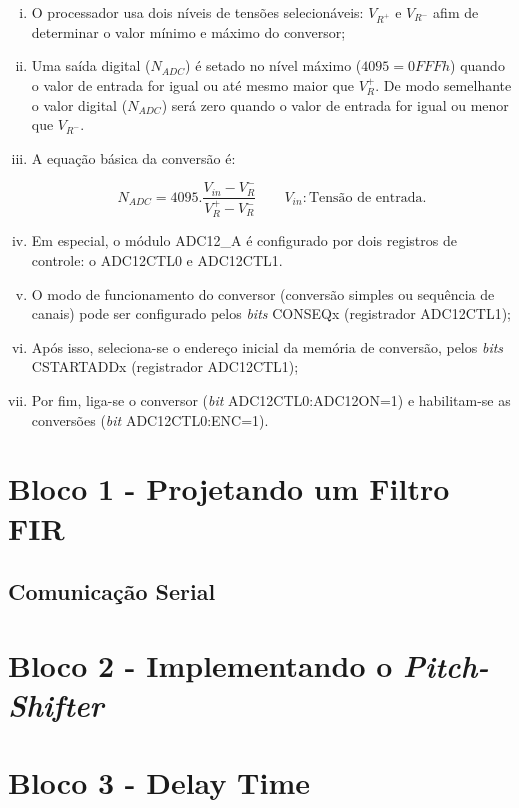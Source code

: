 		\begin{enumerate}[(i)]
			\item O processador usa dois níveis de tensões selecionáveis: $V_{R^{+}} $ e $ V_{R^{-}} $ afim de determinar o valor mínimo e máximo do conversor;
			\item Uma saída digital ($ N_{ADC} $) é setado no nível máximo ($ 4095 = 0FFFh $) quando o valor de entrada for igual ou até mesmo maior que $ V_R^+ $. De modo semelhante o valor digital ($ N_{ADC} $) será zero quando o valor de entrada for igual ou menor que $ V_{R^-} $.
			\item A equação básica da conversão é:
			
			\begin{equation}
				\label{eq-adc12-formula}
				N_{ADC} = 4095.\frac{V_{in}-V_R^-}{V_R^+ - V_R^-}
				\qquad
				V_{in}: \text{Tensão de entrada}.
			\end{equation}
			\item Em especial, o módulo ADC12\_A é configurado por dois registros de controle: o ADC12CTL0 e ADC12CTL1.
			\item  O modo de funcionamento do conversor (conversão simples ou sequência de canais) pode ser configurado pelos \textit{bits} CONSEQx (registrador ADC12CTL1);
			\item Após isso, seleciona-se o endereço inicial da memória de conversão, pelos \textit{bits} CSTARTADDx (registrador ADC12CTL1);
			\item Por fim, liga-se o conversor (\textit{bit} ADC12CTL0:ADC12ON=1) e habilitam-se as conversões (\textit{bit} ADC12CTL0:ENC=1).
		\end{enumerate}
\section{Bloco 1 - Projetando um Filtro FIR}
	\subsection{Comunicação Serial}
		
\section{Bloco 2 - Implementando o \textit{Pitch-Shifter}}

\section{Bloco 3 - Delay Time}